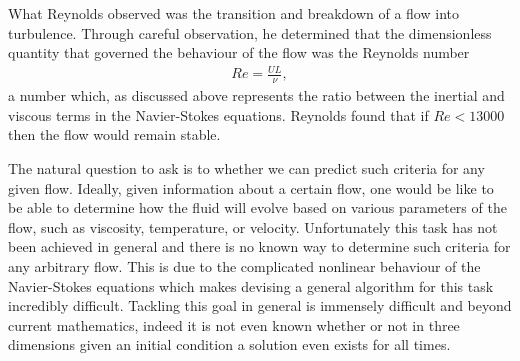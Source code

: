 What Reynolds observed was the transition and breakdown of a flow into turbulence. Through careful observation, he determined that the dimensionless quantity that governed the behaviour of the flow was the Reynolds number 
\begin{align}
Re =\frac{UL}{\nu},
\end{align}
a number which, as discussed above represents the ratio between the inertial and viscous terms in the Navier-Stokes equations. Reynolds found that if $Re<13000$ then the flow would remain stable. 

The natural question to ask is to whether we can predict such criteria for any given flow. Ideally, given information about a certain flow, one would be like to be able to determine how the fluid will evolve based on various parameters of the flow, such as viscosity, temperature, or velocity. Unfortunately this task has not been achieved in general and there is no known way to determine such criteria for any arbitrary flow.  This is due to the complicated nonlinear behaviour of the Navier-Stokes equations which makes devising a general algorithm for this task incredibly difficult. Tackling this goal in general is immensely difficult and beyond current mathematics, indeed it is not even known whether or not in three dimensions given an initial condition a solution even exists for all times.

